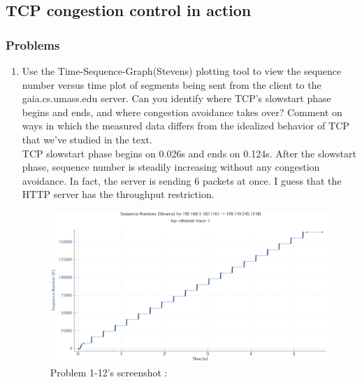 \subsection{TCP congestion control in action}
    \subsubsection*{Problems}
    \begin{enumerate}[label=\bfseries Problem \arabic*:,leftmargin=*,labelindent=1em]
    \addtocounter{enumi}{11}
        \item Use the Time-Sequence-Graph(Stevens) plotting tool to view the sequence number versus time plot of segments being sent from the client to the gaia.cs.umass.edu server. Can you identify where TCP’s slowstart phase begins and ends, and where congestion avoidance takes over? Comment on ways in which the measured data differs from the idealized behavior of TCP that we’ve studied in the text.\\[0.2mm]
        \soln TCP slowstart phase begins on 0.026s and ends on 0.124s. After the slowstart phase, sequence number is steadily increasing without any congestion avoidance. In fact, the server is sending 6 packets at once. I guess that the HTTP server has the throughput restriction.
        \begin{figure}[!h]\centering
        \hspace{15mm}  
    		\includegraphics[width=.85\textwidth]{image/week02/1-9-1.png}
    		\caption{\footnotesize Problem 1-12's screenshot : }
    		\vspace{-10pt}
        \end{figure}
    \end{enumerate}
\newpage